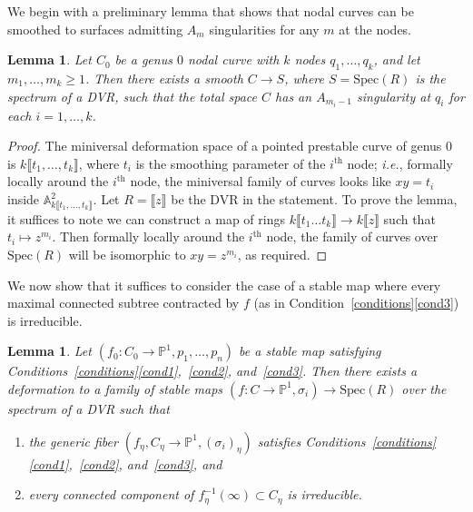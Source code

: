 \documentclass[11pt]{amsart}
\numberwithin{equation}{section}
\newtheorem{lemma}[theorem]{Lemma}
\theoremstyle{definition}
\theoremstyle{remark}
\newcommand{\bP}{{\mathbb P}}
\newcommand{\Spec}{\mathrm{Spec}}
\newcommand{\supth}[1]{\ensuremath{#1^{\mathrm{th}}}}
\begin{document}
We begin with a preliminary lemma that shows that nodal curves can be smoothed to surfaces admitting $A_m$ singularities for any $m$ at the nodes.  

\begin{lemma}\label{lemma:ansing}
Let $C_0$ be a genus $0$ nodal curve with $k$ nodes $q_1, \ldots, q_k$, and let $m_1, \ldots, m_k \geq 1$. Then there exists a smooth $C \to S$, where $S = \Spec(R)$ is the spectrum of a DVR, such that the total space $C$ has an $A_{m_i-1}$ singularity at $q_i$ for each $i = 1, \ldots, k$. 
\end{lemma}

\begin{proof}
The miniversal deformation space of a pointed prestable curve of genus $0$ is $k \llbracket t_1, \dots, t_k \rrbracket$, where $t_i$ is the smoothing parameter of the $\supth{i}$ node; \textit{i.e.}, formally locally around the $\supth{i}$ node, the miniversal family of curves looks like $xy=t_i$ inside $\mathbb{A}^2_{k \llbracket t_1, \dots, t_k \rrbracket}$. Let $R = \llbracket z \rrbracket$ be the DVR in the statement. To prove the lemma, it suffices to note we can construct a map of rings  $k \llbracket t_1 \dots t_k \rrbracket \to k \llbracket z \rrbracket$ such that $t_i \mapsto z^{m_i}$. Then formally locally around the $\supth{i}$ node, the family of curves over $\Spec(R)$ will be isomorphic to $xy = z^{m_i}$, as required. 
\end{proof} 

We now show that it suffices to consider the case of a stable map where every maximal connected subtree contracted by $f$ (as in Condition~\ref{conditions}\eqref{cond3}) is irreducible. 

\begin{lemma}\label{lem:comb}
Let $(f_0\colon C_0 \to \bP^1, p_1, \ldots, p_n)$ be a stable map satisfying Conditions~\ref{conditions}\eqref{cond1},~\eqref{cond2}, and~\eqref{cond3}. Then there exists a deformation to a family of stable maps $(f\colon C \to \bP^1, \sigma_i) \to \Spec(R)$ over the spectrum of a DVR such that 

\begin{enumerate}
\item the generic fiber $(f_\eta, C_\eta \to \bP^1, (\sigma_i)_\eta)$ satisfies Conditions~\ref{conditions}\eqref{cond1},~\eqref{cond2}, and~\eqref{cond3}, and
\item every connected component of $f_\eta^{-1}(\infty) \subset C_\eta$ is irreducible. 
\end{enumerate}
\end{lemma}
\end{document}
